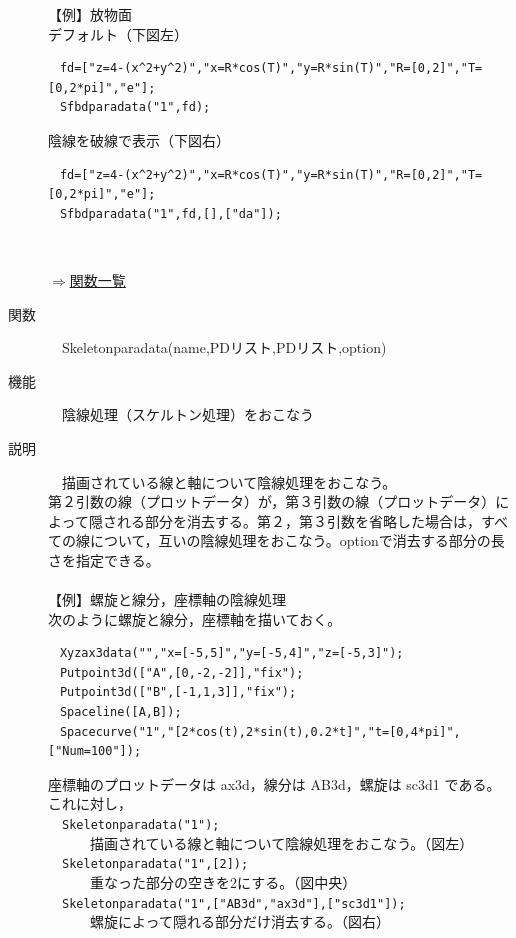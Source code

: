 \documentclass[papersize,a4paper,12pt,uplatex]{jsarticle}
\begin{document}
\begin{description}
【例】放物面\\
デフォルト（下図左）
\begin{verbatim}
　fd=["z=4-(x^2+y^2)","x=R*cos(T)","y=R*sin(T)","R=[0,2]","T=[0,2*pi]","e"];
　Sfbdparadata("1",fd);
\end{verbatim}
陰線を破線で表示（下図右）
\begin{verbatim}
　fd=["z=4-(x^2+y^2)","x=R*cos(T)","y=R*sin(T)","R=[0,2]","T=[0,2*pi]","e"];
　Sfbdparadata("1",fd,[],["da"]);
\end{verbatim}
　　　　　

\begin{flushright} \hyperlink{functionlist3d}{$\Rightarrow$関数一覧}\end{flushright}

\hypertarget{skeletonparadata}{}
\item[関数]　Skeletonparadata(name,PDリスト,PDリスト,option)
\item[機能]　陰線処理（スケルトン処理）をおこなう
\item[説明]　描画されている線と軸について陰線処理をおこなう。\\
第２引数の線（プロットデータ）が，第３引数の線（プロットデータ）によって隠される部分を消去する。第２，第３引数を省略した場合は，すべての線について，互いの陰線処理をおこなう。optionで消去する部分の長さを指定できる。\\
　\\
【例】螺旋と線分，座標軸の陰線処理\\
次のように螺旋と線分，座標軸を描いておく。
\begin{verbatim}
　Xyzax3data("","x=[-5,5]","y=[-5,4]","z=[-5,3]");
　Putpoint3d(["A",[0,-2,-2]],"fix");
　Putpoint3d(["B",[-1,1,3]],"fix");
　Spaceline([A,B]);
　Spacecurve("1","[2*cos(t),2*sin(t),0.2*t]","t=[0,4*pi]",["Num=100"]);
\end{verbatim}
座標軸のプロットデータは ax3d，線分は AB3d，螺旋は sc3d1 である。これに対し，\\
　\verb|Skeletonparadata("1");|\\
　　　描画されている線と軸について陰線処理をおこなう。（図左）\\
　\verb|Skeletonparadata("1",[2]);|\\
　　　重なった部分の空きを2にする。（図中央）\\
　\verb|Skeletonparadata("1",["AB3d","ax3d"],["sc3d1"]);|\\
　　　螺旋によって隠れる部分だけ消去する。（図右）\\


\end{description}
\end{document}
